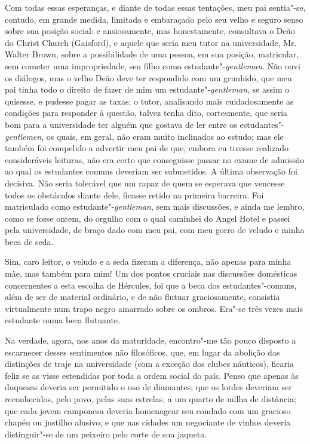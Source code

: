 Com todas essas esperanças, e diante de todas essas tentações, meu
pai sentia"-se, contudo, em grande medida, limitado e embaraçado pelo seu
velho e seguro senso sobre sua posição social: e ansiosamente, mas
honestamente, consultava o Deão do Christ Church (Gaisford), e aquele
que seria meu tutor na universidade, Mr.\,Walter Brown, sobre a
possibilidade de uma pessoa, em sua posição, matricular, sem cometer uma
impropriedade, seu filho como estudante"-\textit{gentleman}. Não ouvi os
diálogos, mas o velho Deão deve ter respondido com um grunhido, que meu
pai tinha todo o direito de fazer de mim um estudante"-\textit{gentleman},
se assim o quisesse, e pudesse pagar as taxas; o tutor, analisando mais
cuidadosamente as condições para responder à questão, talvez tenha dito,
cortesmente, que seria bom para a universidade ter alguém que gostava de
ler entre os estudantes"-\textit{gentlemen}, os quais, em geral, não eram
muito inclinados ao estudo; mas ele também foi compelido a advertir meu
pai de que, embora eu tivesse realizado consideráveis leituras, não era
certo que conseguisse passar no exame de admissão ao qual os estudantes
comuns deveriam ser submetidos. A última observação foi decisiva. Não
seria tolerável que um rapaz de quem se esperava que vencesse todos os
obstáculos diante dele, ficasse retido na primeira barreira. Fui
matriculado como estudante"-\textit{gentleman}, sem mais discussões, e
ainda me lembro, como se fosse ontem, do orgulho com o qual caminhei do
Angel Hotel e passei pela universidade, de braço dado com meu pai, com
meu gorro de veludo e minha beca de seda.

Sim, caro leitor, o veludo e a seda fizeram a diferença, não apenas
para minha mãe, mas também para mim! Um dos pontos cruciais nas
discussões domésticas concernentes a esta escolha de Hércules, foi que a
beca dos estudantes"-comuns, além de ser de material ordinário, e de não
flutuar graciosamente, consistia virtualmente num trapo negro amarrado
sobre os ombros. Era"-se três vezes mais estudante numa beca flutuante.

Na verdade, agora, nos anos da maturidade, encontro"-me tão pouco
disposto a escarnecer desses sentimentos não filosóficos, que, em lugar
da abolição das distinções de traje na universidade (com a exceção dos
clubes náuticos), ficaria feliz se as visse estendidas por toda a ordem
social do país. Penso que apenas às duquesas deveria ser permitido o uso
de diamantes; que os lordes deveriam ser reconhecidos, pelo povo, pelas
suas estrelas, a um quarto de milha de distância; que cada jovem
camponesa deveria homenagear seu condado com um gracioso chapéu ou
justilho alusivo; e que nas cidades um negociante de vinhos deveria
distinguir"-se de um peixeiro pelo corte de sua jaqueta.

